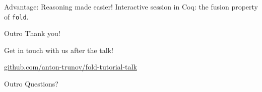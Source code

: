 \documentclass[lualatex]{beamer}
\renewcommand{\_}{\textscale{.6}{\textunderscore}}
\begin{document}
\begin{frame}[fragile]{Advantage: Reasoning made easier!}
Interactive session in Coq: the fusion property of \texttt{fold}.
\end{frame}

\begin{frame}[fragile]{Outro}
\huge
Thank you!

\vspace{10mm}

Get in touch with us after the talk!

\vspace{10mm}
\Large
\href{https://github.com/anton-trunov/fold-tutorial-talk}{github.com/anton-trunov/fold-tutorial-talk}

\end{frame}

\begin{frame}[fragile]{Outro}
\Huge
Questions?
\end{frame}
\end{document}
